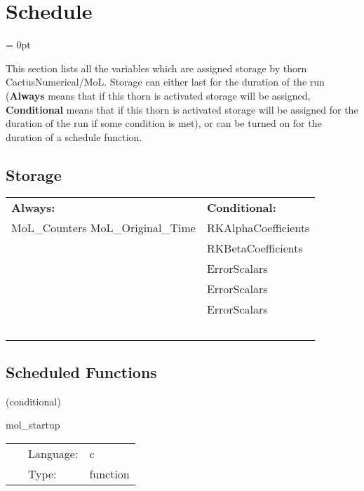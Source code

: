 
\section{Schedule} 


\parskip = 0pt


\noindent This section lists all the variables which are assigned storage by thorn CactusNumerical/MoL.  Storage can either last for the duration of the run ({\bf Always} means that if this thorn is activated storage will be assigned, {\bf Conditional} means that if this thorn is activated storage will be assigned for the duration of the run if some condition is met), or can be turned on for the duration of a schedule function.


\subsection*{Storage}

\hspace{5mm}

 \begin{tabular*}{160mm}{ll} 

{\bf Always:}& {\bf Conditional:} \\ 
 MoL\_Counters MoL\_Original\_Time &  RKAlphaCoefficients\\ 
~ &  RKBetaCoefficients\\ 
~ &  ErrorScalars\\ 
~ &  ErrorScalars\\ 
~ &  ErrorScalars\\ 
~ & ~\\ 
\end{tabular*} 


\subsection*{Scheduled Functions}
\vspace{5mm}

   (conditional) 

\hspace{5mm} mol\_startup 

\hspace{5mm}{\it startup banner } 


\hspace{5mm}

 \begin{tabular*}{160mm}{cll} 
~ & Language:  & c \\ 
~ & Type:  & function \\ 
\end{tabular*} 


